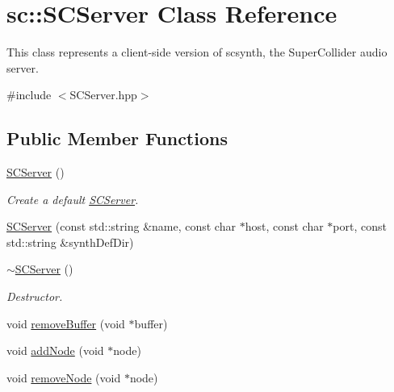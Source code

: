 \hypertarget{classsc_1_1SCServer}{\section{sc\-:\-:S\-C\-Server Class Reference}
\label{classsc_1_1SCServer}
}


This class represents a client-\/side version of scsynth, the Super\-Collider audio server.  




{\ttfamily \#include $<$S\-C\-Server.\-hpp$>$}

\subsection*{Public Member Functions}
\begin{DoxyCompactItemize}
\item 
\hypertarget{classsc_1_1SCServer_aaec728927e957f6190682760bb191661}{\hyperlink{classsc_1_1SCServer_aaec728927e957f6190682760bb191661}{S\-C\-Server} ()}\label{classsc_1_1SCServer_aaec728927e957f6190682760bb191661}

\begin{DoxyCompactList}\small\item\em Create a default \hyperlink{classsc_1_1SCServer}{S\-C\-Server}. \end{DoxyCompactList}\item 
\hyperlink{classsc_1_1SCServer_a5be05ff132abc5927e5ce3423978238d}{S\-C\-Server} (const std\-::string \&name, const char $\ast$host, const char $\ast$port, const std\-::string \&synth\-Def\-Dir)
\item 
\hypertarget{classsc_1_1SCServer_a673ad092d5d67da3be3aa04f2ac19ec6}{\hyperlink{classsc_1_1SCServer_a673ad092d5d67da3be3aa04f2ac19ec6}{$\sim$\-S\-C\-Server} ()}\label{classsc_1_1SCServer_a673ad092d5d67da3be3aa04f2ac19ec6}

\begin{DoxyCompactList}\small\item\em Destructor. \end{DoxyCompactList}\item 
void \hyperlink{classsc_1_1SCServer_af37066ecf33f14b2d26be8b455026f73}{remove\-Buffer} (void $\ast$buffer)
\item 
void \hyperlink{classsc_1_1SCServer_a0b1f014764c249411c7b033b5cd2aca3}{add\-Node} (void $\ast$node)
\item 
void \hyperlink{classsc_1_1SCServer_ac024296f9c382e9f2bb00bc765695565}{remove\-Node} (void $\ast$node)
\end{DoxyCompactItemize}
